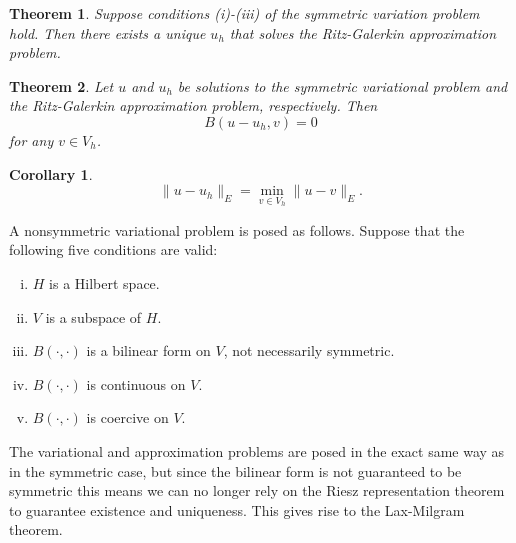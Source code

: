 \documentclass[11pt]{article}
\newtheorem{theorem}{Theorem}
\newtheorem{corollary}{Corollary}
\theoremstyle{definition}
\begin{document}
\begin{theorem}
	Suppose conditions (i)-(iii) of the symmetric variation problem hold.
	Then there exists a unique $u_h$ that solves the Ritz-Galerkin approximation problem.
\end{theorem}

\begin{theorem}
	Let $u$ and $u_h$ be solutions to the symmetric variational problem and the Ritz-Galerkin approximation problem, respectively.
	Then
	\begin{equation*}
		B(u-u_h,v) = 0
	\end{equation*}
	for any $v \in V_h$.
\end{theorem}

\begin{corollary}
	\begin{equation*}
		\|u - u_h\|_E = \min_{v \in V_h}\|u - v\|_E.
	\end{equation*}
\end{corollary}

A nonsymmetric variational problem is posed as follows. Suppose that the following five conditions are valid:
\begin{enumerate}[(i)]
	\item $H$ is a Hilbert space.
	\item $V$ is a subspace of $H$.
	\item $B(\cdot, \cdot)$ is a bilinear form on $V$, not necessarily symmetric.
	\item $B(\cdot, \cdot)$ is continuous on $V$.
	\item $B(\cdot, \cdot)$ is coercive on $V$.
\end{enumerate}
The variational and approximation problems are posed in the exact same way as in the symmetric case, but since the bilinear form is not guaranteed to be symmetric
this means we can no longer rely on the Riesz representation theorem to guarantee existence and uniqueness.
This gives rise to the Lax-Milgram theorem.
\end{document}
